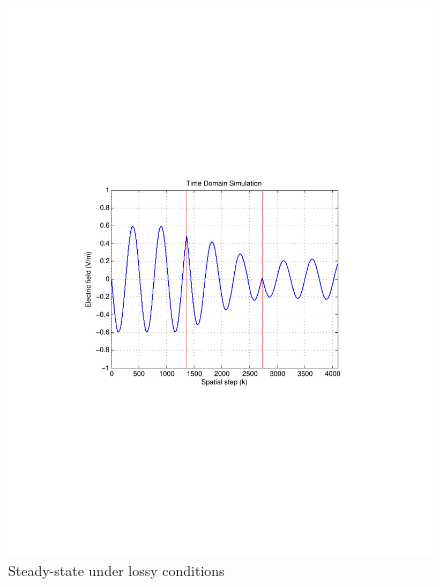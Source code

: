 \begin{figure}[H]
\centering
\includegraphics[scale=0.78, trim=3.5cm 8.7cm 4.5cm 8.75cm, clip]{FigCh03_1DDNGSteadyStateLossy.pdf}
\caption{Steady-state under lossy conditions}
\label{1DDNG-SteadyState-Lossy}
\end{figure}